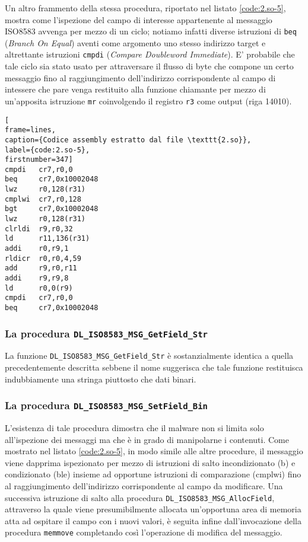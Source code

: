 \documentclass[10pt,a4paper, titlepage]{report}
\begin{document}
Un altro frammento della stessa procedura, riportato nel listato \ref{code:2.so-5}, mostra come l'ispezione del campo di interesse appartenente al messaggio ISO8583 avvenga per mezzo di un ciclo; notiamo infatti diverse istruzioni di \texttt{beq} (\textit{Branch On Equal}) aventi come argomento uno stesso indirizzo target e altrettante istruzioni \texttt{cmpdi} (\textit{Compare Doubleword Immediate}). 
E' probabile che tale ciclo sia stato usato per attraversare il flusso di byte che compone un certo messaggio fino al raggiungimento dell'indirizzo corrispondente al campo di intessere che pare venga restituito alla funzione chiamante per mezzo di un'apposita istruzione \texttt{mr} coinvolgendo il registro \texttt{r3} come output (riga 14010).

\begin{lstlisting}[
frame=lines, 
caption={Codice assembly estratto dal file \texttt{2.so}}, 
label={code:2.so-5},
firstnumber=347]
cmpdi   cr7,r0,0
beq     cr7,0x10002048
lwz     r0,128(r31)
cmplwi  cr7,r0,128
bgt     cr7,0x10002048
lwz     r0,128(r31)
clrldi  r9,r0,32
ld      r11,136(r31)
addi    r0,r9,1
rldicr  r0,r0,4,59
add     r9,r0,r11
addi    r9,r9,8
ld      r0,0(r9)
cmpdi   cr7,r0,0
beq     cr7,0x10002048
\end{lstlisting}

\subsubsection{La procedura \texttt{DL\_ISO8583\_MSG\_GetField\_Str}}

La funzione \texttt{DL\_ISO8583\_MSG\_GetField\_Str} è sostanzialmente identica a quella precedentemente descritta sebbene il nome suggerisca che tale funzione restituisca indubbiamente una stringa piuttosto che dati binari.

\subsubsection{La procedura \texttt{DL\_ISO8583\_MSG\_SetField\_Bin}}

L'esistenza di tale procedura dimostra che il malware non si limita solo all'ispezione dei messaggi ma che è in grado di manipolarne i contenuti. 
Come mostrato nel listato \ref{code:2.so-5}, in modo simile alle altre procedure, il messaggio viene dapprima ispezionato per mezzo di istruzioni di salto incondizionato (b) e condizionato (ble) insieme ad opportune istruzioni di comparazione (cmplwi) fino al raggiungimento dell'indirizzo corrispondente al campo da modificare.
Una successiva istruzione di salto alla procedura \texttt{DL\_ISO8583\_MSG\_AllocField}, attraverso la quale viene presumibilmente allocata un'opportuna area di memoria atta ad ospitare il campo con i nuovi valori, è seguita infine dall'invocazione della procedura \texttt{memmove} completando così l'operazione di modifica del messaggio.
\end{document}
